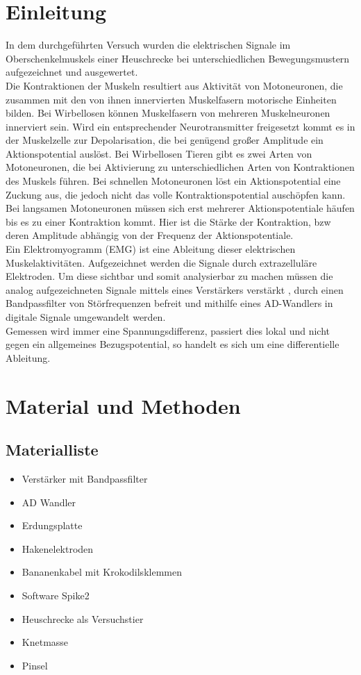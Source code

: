 \section{Einleitung}
In dem durchgeführten Versuch wurden die elektrischen Signale im Oberschenkelmuskels einer Heuschrecke bei unterschiedlichen Bewegungsmustern aufgezeichnet und ausgewertet.\\
Die Kontraktionen der Muskeln resultiert aus Aktivität von Motoneuronen, die zusammen mit den von ihnen innervierten Muskelfasern motorische Einheiten bilden. Bei Wirbellosen können Muskelfasern von mehreren Muskelneuronen innerviert sein. Wird ein entsprechender Neurotransmitter freigesetzt kommt es in der Muskelzelle zur Depolarisation, die bei genügend großer Amplitude ein Aktionspotential auslöst. Bei Wirbellosen Tieren gibt es zwei Arten von Motoneuronen, die bei Aktivierung zu unterschiedlichen Arten von Kontraktionen des Muskels führen. Bei schnellen Motoneuronen löst ein Aktionspotential eine Zuckung aus, die jedoch nicht das volle Kontraktionspotential auschöpfen kann. Bei langsamen Motoneuronen müssen sich erst mehrerer Aktionspotentiale häufen bis es zu einer Kontraktion kommt. Hier ist die Stärke der Kontraktion, bzw deren Amplitude abhängig von der Frequenz der Aktionspotentiale.\\
Ein Elektromyogramm (EMG) ist eine Ableitung dieser elektrischen Muskelaktivitäten. Aufgezeichnet werden die Signale durch extrazelluläre Elektroden. Um diese sichtbar und somit analysierbar zu machen müssen die analog aufgezeichneten Signale mittels eines Verstärkers verstärkt , durch einen Bandpassfilter von Störfrequenzen befreit und mithilfe eines AD-Wandlers in digitale Signale umgewandelt werden.\\
Gemessen wird immer eine Spannungsdifferenz, passiert dies lokal und nicht gegen ein allgemeines Bezugspotential, so handelt es sich um eine differentielle Ableitung.

\section{Material und Methoden}

\subsection{Materialliste}
\begin{itemize}
\item Verstärker mit Bandpassfilter
\item AD Wandler
\item Erdungsplatte
\item Hakenelektroden
\item Bananenkabel mit Krokodilsklemmen
\item Software Spike2
\item Heuschrecke als Versuchstier 
\item Knetmasse
\item Pinsel
\end{itemize}

